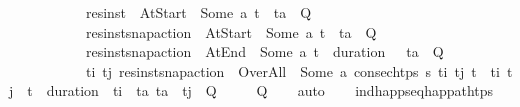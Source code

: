 \begin{isabellebody}
\ \ \ \ \ \ \ \ \ \ \ {\isasymlbrakk}res{\isacharunderscore}{\kern0pt}inst\ {\isasympi}\ At{\isacharunderscore}{\kern0pt}Start\ {\isacharequal}{\kern0pt}\ Some\ a{\isacharsemicolon}{\kern0pt}\ t\isactrlsub {\isasympi}\ {\isacharequal}{\kern0pt}\ t\isactrlsub a{\isasymrbrakk}\ {\isasymLongrightarrow}\ Q{\isacharsemicolon}{\kern0pt}\isanewline
\ \ \ \ \ \ \ \ \ \ \ {\isasymlbrakk}res{\isacharunderscore}{\kern0pt}inst{\isacharunderscore}{\kern0pt}snap{\isacharunderscore}{\kern0pt}action\ {\isasympi}\ At{\isacharunderscore}{\kern0pt}Start\ {\isacharequal}{\kern0pt}\ Some\ a{\isacharsemicolon}{\kern0pt}\ t\isactrlsub {\isasympi}\ {\isacharequal}{\kern0pt}\ t\isactrlsub a{\isasymrbrakk}\ {\isasymLongrightarrow}\ Q{\isacharsemicolon}{\kern0pt}\isanewline
\ \ \ \ \ \ \ \ \ \ \ {\isasymlbrakk}res{\isacharunderscore}{\kern0pt}inst{\isacharunderscore}{\kern0pt}snap{\isacharunderscore}{\kern0pt}action\ {\isasympi}\ At{\isacharunderscore}{\kern0pt}End\ {\isacharequal}{\kern0pt}\ Some\ a{\isacharsemicolon}{\kern0pt}\ t\isactrlsub {\isasympi}\ {\isacharplus}{\kern0pt}\ {\isacharparenleft}{\kern0pt}duration\ {\isasympi}{\isacharparenright}{\kern0pt}\ {\isacharequal}{\kern0pt}\ t\isactrlsub a{\isasymrbrakk}\ {\isasymLongrightarrow}\ Q{\isacharsemicolon}{\kern0pt}\isanewline
\ \ \ \ \ \ \ \ \ \ \ {\isasymAnd}t\isactrlsub i\ t\isactrlsub j{\isachardot}{\kern0pt}\ {\isasymlbrakk}res{\isacharunderscore}{\kern0pt}inst{\isacharunderscore}{\kern0pt}snap{\isacharunderscore}{\kern0pt}action\ {\isasympi}\ Over{\isacharunderscore}{\kern0pt}All\ {\isacharequal}{\kern0pt}\ Some\ a{\isacharsemicolon}{\kern0pt}\ consec{\isacharunderscore}{\kern0pt}htps\ {\isasympi}s\ t\isactrlsub i\ t\isactrlsub j{\isacharsemicolon}{\kern0pt}\ t\isactrlsub {\isasympi}\ {\isasymle}\ t\isactrlsub i{\isacharsemicolon}{\kern0pt}\ t\isactrlsub j\ {\isasymle}\ t\isactrlsub {\isasympi}\ {\isacharplus}{\kern0pt}\ {\isacharparenleft}{\kern0pt}duration\ {\isasympi}{\isacharparenright}{\kern0pt}{\isacharsemicolon}{\kern0pt}\ t\isactrlsub i\ {\isacharless}{\kern0pt}\ t\isactrlsub a{\isacharsemicolon}{\kern0pt}\ t\isactrlsub a\ {\isacharless}{\kern0pt}\ t\isactrlsub j{\isasymrbrakk}\ {\isasymLongrightarrow}\ Q{\isasymrbrakk}\isanewline
\ \ \ \ {\isasymLongrightarrow}\ Q{\isachardoublequoteclose}\isanewline
%
\isadelimproof
\ \ %
\endisadelimproof
%
\isatagproof
{}\isamarkupfalse%
\ auto%
\endisatagproof
{\isafoldproof}%
%
\isadelimproof
\isanewline
%
\endisadelimproof
\ \ \isanewline
{}\isamarkupfalse%
\ ind{\isacharunderscore}{\kern0pt}happ{\isacharunderscore}{\kern0pt}seq{\isacharunderscore}{\kern0pt}happ{\isacharunderscore}{\kern0pt}at{\isacharunderscore}{\kern0pt}htps{\isacharcolon}{\kern0pt}\isanewline

\end{isabellebody}
